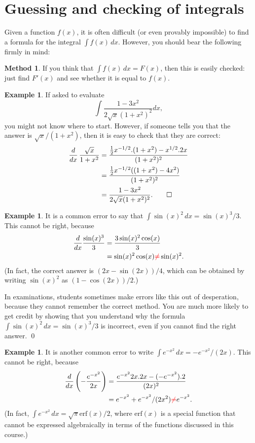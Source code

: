 \documentclass[a4paper]{book}
\theoremstyle{definition}
\newtheorem{example}[theorem]{Example}
\newtheorem{method}[theorem]{Method}
\begin{document}
\section{Guessing and checking of integrals}
\label{sec-int-guess}

Given a function $f(x)$, it is often difficult (or even provably
impossible) to find a formula for the integral $\int f(x)\,dx$.
However, you should bear the following firmly in mind:
\begin{method}
 If you think that $\int f(x)\,dx=F(x)$, then this is easily checked:
 just find $F'(x)$ and see whether it is equal to $f(x)$.
\end{method}

\begin{example}
 If asked to evaluate
 \[ \int \frac{1 - 3x^2}{2\sqrt{x}(1 + x^2)^2} dx, \]
 you might not know where to start.  However, if someone tells you
 that the answer is $\sqrt{x}/(1+x^2)$, then it is easy to check
 that they are correct:
 \begin{align*}
  \frac{d}{dx}\,\frac{\sqrt{x}}{1+x^2} 
   &= \frac{\frac{1}{2}x^{-1/2}.(1+x^2) - x^{1/2}.2x}{(1+x^2)^2} \\
   &= \frac{\frac{1}{2}x^{-1/2}((1+x^2)-4x^2)}{(1+x^2)^2} \\
   &= \frac{1-3x^2}{2\sqrt{x}(1+x^2)^2}. \qed
 \end{align*}
\end{example}
\begin{example}
 It is a common error to say that $\int\sin(x)^2\,dx=\sin(x)^3/3$.
 This cannot be right, because
 \begin{align*}
  \frac{d}{dx}\frac{\sin(x)^3}{3} &= \frac{3\sin(x)^2\cos(x)}{3} \\
   &= \sin(x)^2\cos(x) {\color{red}\neq} \sin(x)^2.
 \end{align*}
 (In fact, the correct answer is $(2x-\sin(2x))/4$, which can be
 obtained by writing $\sin(x)^2$ as $(1-\cos(2x))/2$.)

 In examinations, students sometimes make errors like this out of
 desperation, because they cannot remember the correct method.  You
 are much more likely to get credit by showing that you understand why
 the formula $\int\sin(x)^2\,dx=\sin(x)^3/3$ is incorrect, even if you
 cannot find the right answer.
 \qed
\end{example}
\begin{example}
 It is another common error to write
 $\int e^{-x^2}\,dx=-e^{-x^2}/(2x)$.  This cannot be right, because
 \begin{align*}
  \frac{d}{dx}\left(-\frac{e^{-x^2}}{2x}\right) &= 
   \frac{e^{-x^2}2x.2x - (-e^{-x^2}).2}{(2x)^2} \\
   &= e^{-x^2} + e^{-x^2}/(2x^2) {\color{red}\neq} e^{-x^2}.
 \end{align*}
 (In fact, $\int e^{-x^2}\,dx=\sqrt{\pi}\text{erf}(x)/2$, where
 $\text{erf}(x)$ is a special function that cannot be expressed
 algebraically in terms of the functions discussed in this course.)
\end{example}
\end{document}
